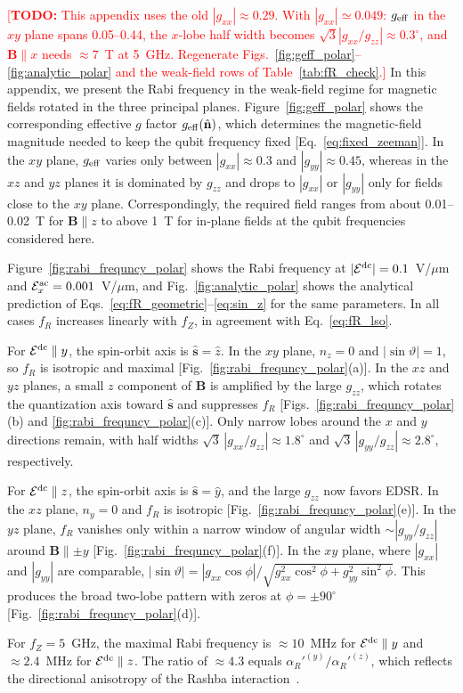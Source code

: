 \documentclass[
  aps,
  reprint,
  amsmath,
  amssymb,
  groupedaddress,
  floatfix,
  longbibliography,
]{revtex4-2}
\newcommand{\todo}[1]{\textcolor{red}{[\textbf{TODO:} #1]}}
\newcommand{\Eac}{\mathcal{E}^{\rm ac}_x}
\newcommand{\Edc}{\mathcal{E}^{\rm dc}}
\newcommand{\nhat}{\hat{\mathbf n}}
\newcommand{\shat}{\hat{\mathbf s}}
\begin{document}
\todo{This appendix uses the old $|g_{xx}|\approx0.29$. With $|g_{xx}|\simeq0.049$: $g_{\rm eff}$ in the $xy$ plane spans 0.05--0.44, the $x$-lobe half width becomes $\sqrt3|g_{xx}/g_{zz}|\approx0.3^\circ$, and $\mathbf{B}\parallel x$ needs $\approx7$~T at 5~GHz. Regenerate Figs.~\ref{fig:geff_polar}--\ref{fig:analytic_polar} and the weak-field rows of Table~\ref{tab:fR_check}.}
In this appendix, we present the Rabi frequency in the weak-field regime for magnetic fields rotated in the three principal planes. Figure~\ref{fig:geff_polar} shows the corresponding effective $g$ factor $g_{\rm eff}(\nhat)$, which determines the magnetic-field magnitude needed to keep the qubit frequency fixed [Eq.~\eqref{eq:fixed_zeeman}]. In the $xy$ plane, $g_{\rm eff}$ varies only between $|g_{xx}|\approx0.3$ and $|g_{yy}|\approx0.45$, whereas in the $xz$ and $yz$ planes it is dominated by $g_{zz}$ and drops to $|g_{xx}|$ or $|g_{yy}|$ only for fields close to the $xy$ plane. Correspondingly, the required field ranges from about 0.01--0.02~T for $\mathbf{B}\parallel z$ to above 1~T for in-plane fields at the qubit frequencies considered here.

Figure~\ref{fig:rabi_frequncy_polar} shows the Rabi frequency at $|\Edc|=0.1$~V/$\mu$m and $\Eac=0.001$~V/$\mu$m, and Fig.~\ref{fig:analytic_polar} shows the analytical prediction of Eqs.~\eqref{eq:fR_geometric}--\eqref{eq:sin_z} for the same parameters. In all cases $f_R$ increases linearly with $f_Z$, in agreement with Eq.~\eqref{eq:fR_lso}.

For $\Edc\parallel y$, the spin-orbit axis is $\shat=\hat z$. In the $xy$ plane, $n_z=0$ and $|\sin\vartheta|=1$, so $f_R$ is isotropic and maximal [Fig.~\ref{fig:rabi_frequncy_polar}(a)]. In the $xz$ and $yz$ planes, a small $z$ component of $\mathbf{B}$ is amplified by the large $g_{zz}$, which rotates the quantization axis toward $\shat$ and suppresses $f_R$ [Figs.~\ref{fig:rabi_frequncy_polar}(b) and \ref{fig:rabi_frequncy_polar}(c)]. Only narrow lobes around the $x$ and $y$ directions remain, with half widths $\sqrt3\,|g_{xx}/g_{zz}|\approx1.8^\circ$ and $\sqrt3\,|g_{yy}/g_{zz}|\approx2.8^\circ$, respectively.

For $\Edc\parallel z$, the spin-orbit axis is $\shat=\hat y$, and the large $g_{zz}$ now favors EDSR. In the $xz$ plane, $n_y=0$ and $f_R$ is isotropic [Fig.~\ref{fig:rabi_frequncy_polar}(e)]. In the $yz$ plane, $f_R$ vanishes only within a narrow window of angular width $\sim|g_{yy}/g_{zz}|$ around $\mathbf{B}\parallel\pm y$ [Fig.~\ref{fig:rabi_frequncy_polar}(f)]. In the $xy$ plane, where $|g_{xx}|$ and $|g_{yy}|$ are comparable, $|\sin\vartheta|=|g_{xx}\cos\phi|/\sqrt{g_{xx}^2\cos^2\phi+g_{yy}^2\sin^2\phi}$. This produces the broad two-lobe pattern with zeros at $\phi=\pm90^\circ$ [Fig.~\ref{fig:rabi_frequncy_polar}(d)].

For $f_Z=5$~GHz, the maximal Rabi frequency is $\approx10$~MHz for $\Edc\parallel y$ and $\approx2.4$~MHz for $\Edc\parallel z$. The ratio of $\approx4.3$ equals $\alpha_R'^{(y)}/\alpha_R'^{(z)}$, which reflects the directional anisotropy of the Rashba interaction~\cite{das2026anisotropic}.



\end{document}
